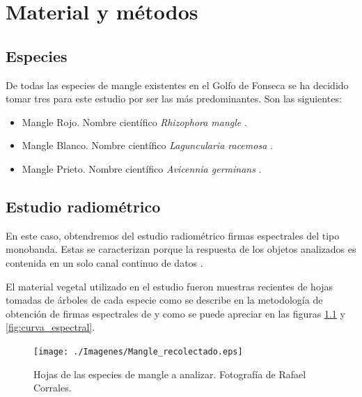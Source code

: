 


\chapter{Material y métodos}
\label{cap:materialymetodos}

\section{Especies}
De todas las especies de mangle existentes en el Golfo de Fonseca se ha decidido tomar tres para este estudio por ser las más predominantes. Son las siguientes:

\begin{itemize}
	\item Mangle Rojo. Nombre científico \textit{Rhizophora mangle} \citep{JimenezRhizophora}.
	\item Mangle Blanco. Nombre científico \textit{Laguncularia racemosa} \citep{JimenezLaguncularia}.
	\item Mangle Prieto. Nombre científico \textit{Avicennia germinans} \citep{JimenezAvicennia}.
\end{itemize}

\section{Estudio radiométrico}
En este caso, obtendremos del estudio radiométrico firmas espectrales del tipo monobanda. Estas se caracterizan porque la respuesta de los objetos analizados es contenida en un solo canal continuo de datos \citep{andinofase1}.\Sep

El material vegetal utilizado en el estudio fueron muestras recientes de hojas tomadas de árboles de cada especie como se describe en la metodología de obtención de firmas espectrales de \cite{andinofase2} y como se puede apreciar en las figuras \ref{fig:mangle_recolectado} y \ref{fig:curva_espectral}.

\begin{figure}
	\centering
	\texttt{[image: ./Imagenes/Mangle\_recolectado.eps]}
	\caption[Mangle recolectado]{Hojas de las especies de mangle a analizar. Fotografía de Rafael Corrales.}
	\label{fig:mangle_recolectado}
\end{figure}

